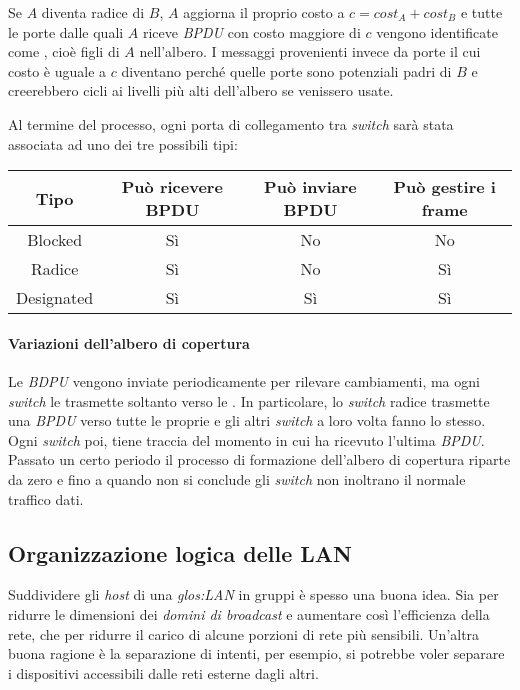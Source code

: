 Se $A$ diventa radice di $B$, $A$ aggiorna il proprio costo a $c=cost_A+cost_B$
e tutte le porte dalle quali $A$ riceve \emph{BPDU} con costo maggiore di $c$
vengono identificate come \emph{}, cioè figli di $A$
nell'albero. I messaggi provenienti invece da porte il cui costo è uguale a $c$
diventano \emph{} perché quelle porte sono potenziali
padri di $B$ e creerebbero cicli ai livelli più alti dell'albero se venissero
usate.

\bigskip\noindent
Al termine del processo, ogni porta di collegamento tra \emph{switch} sarà
stata associata ad uno dei tre possibili tipi:
\begin{table}[ht!]
    \centering
    \renewcommand{\arraystretch}{1.2}
    \begin{tabular}{|c|c|c|c|}
        \hline
        \textbf{Tipo} & \textbf{Può ricevere BPDU} & \textbf{Può inviare BPDU}
        & \textbf{Può gestire i frame}\\
        \hline
        Blocked & Sì & No & No\\
        \hline
        Radice & Sì & No & Sì\\
        \hline
        Designated & Sì & Sì & Sì\\
        \hline
    \end{tabular}
\end{table}

\paragraph{Variazioni dell'albero di copertura}
Le \emph{BDPU} vengono inviate periodicamente per rilevare cambiamenti, ma ogni
\emph{switch} le trasmette soltanto verso le \emph{}.
In particolare, lo \emph{switch} radice trasmette una \emph{BPDU} verso tutte
le proprie \emph{} e gli altri \emph{switch} a loro
volta fanno lo stesso. Ogni \emph{switch} poi, tiene traccia del momento in
cui ha ricevuto l'ultima \emph{BPDU}. Passato un certo periodo il processo di
formazione dell'albero di copertura riparte da zero e fino a quando non si
conclude gli \emph{switch} non inoltrano il normale traffico dati.

\subsection{Organizzazione logica delle LAN}
Suddividere gli \emph{host} di una \emph{\gls{glos:LAN}} in gruppi è spesso una
buona idea. Sia per ridurre le dimensioni dei \emph{domini di broadcast} e
aumentare così l'efficienza della rete, che per ridurre il carico di alcune
porzioni di rete più sensibili. Un'altra buona ragione è la separazione di
intenti, per esempio, si potrebbe voler separare i dispositivi accessibili
dalle reti esterne dagli altri.

